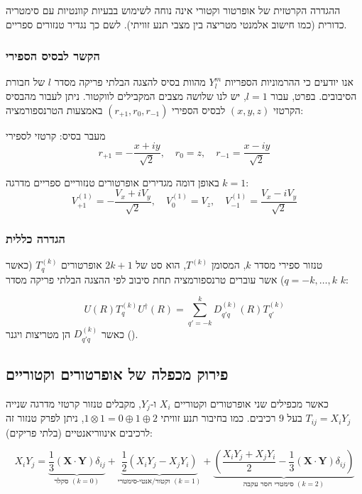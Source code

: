 ההגדרה הקרטזית של אופרטור וקטורי אינה נוחה לשימוש בבעיות קוונטיות עם סימטריה כדורית (כמו חישוב אלמנטי מטריצה בין מצבי תנע זוויתי). לשם כך נגדיר טנזורים ספריים.

\subsubsection{הקשר לבסיס הספירי}
אנו יודעים כי ההרמוניות הספריות $Y_{l}^m$ מהוות בסיס להצגה הבלתי פריקה מסדר $l$ של חבורת הסיבובים. בפרט, עבור $l=1$, יש לנו שלושה מצבים המקבילים לווקטור.
ניתן לעבור מהבסיס הקרטזי $(x, y, z)$ לבסיס הספירי $(r_{+1}, r_0, r_{-1})$ באמצעות הטרנספורמציה:

\begin{resultbox}{מעבר בסיס: קרטזי לספירי}
\[
r_{+1} = -\frac{x + iy}{\sqrt{2}}, \quad r_0 = z, \quad r_{-1} = \frac{x - iy}{\sqrt{2}}
\]
\end{resultbox}
באופן דומה מגדירים אופרטורים טנזוריים ספריים מדרגה $k=1$:
\[
V_{+1}^{(1)} = -\frac{V_x + iV_y}{\sqrt{2}}, \quad V_0^{(1)} = V_z, \quad V_{-1}^{(1)} = \frac{V_x - iV_y}{\sqrt{2}}
\]

\subsubsection{הגדרה כללית}
טנזור ספירי מסדר $k$, המסומן $T^{(k)}$, הוא סט של $2k+1$ אופרטורים $T_q^{(k)}$ (כאשר $q = -k, \dots, k$) אשר עוברים טרנספורמציה תחת סיבוב לפי ההצגה הבלתי פריקה מסדר $k$:

\[
U(R) T_q^{(k)} U^\dagger(R) = \sum_{q'=-k}^{k} D_{q'q}^{(k)}(R) T_{q'}^{(k)}
\]
כאשר $D_{q'q}^{(k)}$ הן מטריצות ויגנר ().

\subsection{פירוק מכפלה של אופרטורים וקטוריים}

כאשר מכפילים שני אופרטורים וקטוריים $X_i$ ו-$Y_j$, מקבלים טנזור קרטזי מדרגה שנייה $T_{ij} = X_i Y_j$ בעל 9 רכיבים. כמו בחיבור תנע זוויתי $1 \otimes 1 = 0 \oplus 1 \oplus 2$, ניתן לפרק טנזור זה לרכיבים אינווריאנטיים (בלתי פריקים):

\begin{equation}
X_i Y_j = \underbrace{\frac{1}{3}(\mathbf{X}\cdot\mathbf{Y})\delta_{ij}}_{\text{סקלר } (k=0)} + \underbrace{\frac{1}{2}(X_i Y_j - X_j Y_i)}_{\text{וקטור/אנטי-סימטרי } (k=1)} + \underbrace{\left(\frac{X_i Y_j + X_j Y_i}{2} - \frac{1}{3}(\mathbf{X}\cdot\mathbf{Y})\delta_{ij}\right)}_{\text{סימטרי חסר עקבה } (k=2)}
\end{equation}

